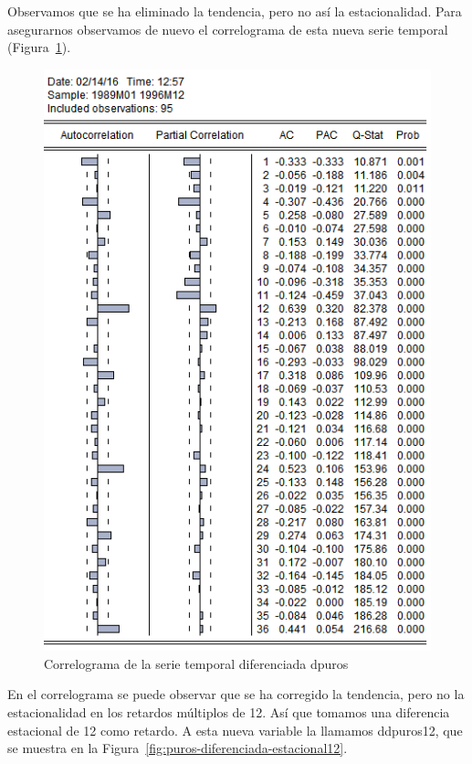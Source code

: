 \documentclass[12pt,a4paper,twoside,openright,titlepage,final]{article}
\begin{document}
Observamos que se ha eliminado la tendencia, pero no así la estacionalidad. Para asegurarnos observamos de nuevo el correlograma de esta nueva serie temporal (Figura~\ref{fig:correlograma-puros-diferenciada}).\\


\begin{figure}[tbph!]
	\centering
	\includegraphics[width=0.8\linewidth]{imagenes/puros/correlograma-puros-diferenciada.png}
	\caption{Correlograma de la serie temporal diferenciada dpuros}
	\label{fig:correlograma-puros-diferenciada}
\end{figure}

En el correlograma se puede observar que se ha corregido la tendencia, pero no la estacionalidad en los retardos múltiplos de 12. Así que tomamos una diferencia estacional de 12 como retardo. A esta nueva variable la llamamos ddpuros12, que se muestra en la Figura~\ref{fig:puros-diferenciada-estacional12}.\\
\end{document}
